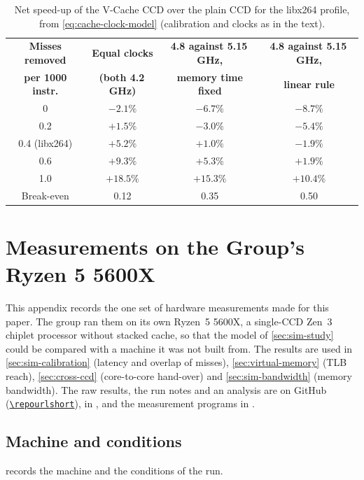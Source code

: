 \begin{table}[htbp]
  \centering
  \caption[Net speed-up of the V-Cache CCD over the plain CCD for the libx264 profile]{Net speed-up of the V-Cache CCD over the plain CCD for the libx264 profile, from \cref{eq:cache-clock-model} (calibration and clocks as in the text).}
  \label{tab:cache-clock-model}
  \small
  \begin{tabular}{@{}cccc@{}}
    \toprule
    \textbf{Misses removed} & \textbf{Equal clocks} & \textbf{4.8 against 5.15\,GHz,} & \textbf{4.8 against 5.15\,GHz,} \\
    \textbf{per 1000 instr.} & \textbf{(both 4.2\,GHz)} & \textbf{memory time fixed} & \textbf{linear rule} \\
    \midrule
    0 & $-2.1\%$ & $-6.7\%$ & $-8.7\%$ \\
    0.2 & $+1.5\%$ & $-3.0\%$ & $-5.4\%$ \\
    0.4 (libx264) & $+5.2\%$ & $+1.0\%$ & $-1.9\%$ \\
    0.6 & $+9.3\%$ & $+5.3\%$ & $+1.9\%$ \\
    1.0 & $+18.5\%$ & $+15.3\%$ & $+10.4\%$ \\
    \midrule
    Break-even & 0.12 & 0.35 & 0.50 \\
    \bottomrule
  \end{tabular}
\end{table}
\clearpage
\section{Measurements on the Group's Ryzen 5 5600X}
\label{app:5600x}

This appendix records the one set of hardware measurements made for this paper. The group ran them on its own Ryzen~5 5600X, a single-CCD Zen~3 chiplet processor without stacked cache, so that the model of \cref{sec:sim-study} could be compared with a machine it was not built from. The results are used in \cref{sec:sim-calibration} (latency and overlap of misses), \cref{sec:virtual-memory} (TLB reach), \cref{sec:cross-ccd} (core-to-core hand-over) and \cref{sec:sim-bandwidth} (memory bandwidth). The raw results, the run notes and an analysis are on GitHub (\href{\repourl}{\nolinkurl{\repourlshort}}), in , and the measurement programs in .

\subsection*{Machine and conditions}
 records the machine and the conditions of the run.

